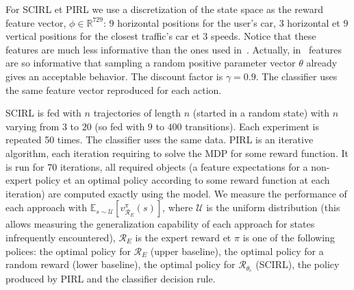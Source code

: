 \documentclass[english,utf8]{./hermes-journal}
\newcommand{\R}{\mathcal{R}}
\newcommand{\E}{\mathbb{E}}
\begin{document}
For SCIRL et PIRL we use a discretization of the state space as the
reward feature vector, $\phi\in\mathbb{R}^{729}$: $9$ horizontal
positions for the user's car, $3$ horizontal et $9$ vertical
positions for the closest traffic's car et $3$ speeds. Notice that
these features are much less informative than the ones used
in~\cite{Abbeel:2004,Syed:2008:game}. Actually,
in~\cite{Syed:2008:game} features are so informative that sampling a
random positive parameter vector $\theta$ already gives an
acceptable behavior. The discount factor is $\gamma = 0.9$. The
classifier uses the same feature vector reproduced for each action.

SCIRL is fed with $n$ trajectories of length $n$ (started in a
random state) with $n$ varying from $3$ to $20$ (so fed with $9$ to
$400$ transitions). Each experiment is repeated 50 times. The
 classifier uses the same data. PIRL is an iterative
algorithm, each iteration requiring to solve the MDP for some reward
function. It is run for 70 iterations, all required objects (a
feature expectations for a non-expert policy et an optimal policy
according to some reward function at each iteration) are computed
exactly using the model. We measure the performance of each approach
with $\E_{s\sim \mathcal{U}}[v^\pi_{\R_E}(s)]$, where $\mathcal{U}$
is the uniform distribution (this allows measuring the
generalization capability of each approach for states infrequently
encountered), $\R_E$ is the expert reward et $\pi$ is one of the
following polices: the optimal policy for $\R_E$ (upper baseline),
the optimal policy for a random reward (lower baseline), the optimal
policy for $\R_{\theta_c}$ (SCIRL), the policy produced by PIRL and
the classifier decision rule.
\end{document}

